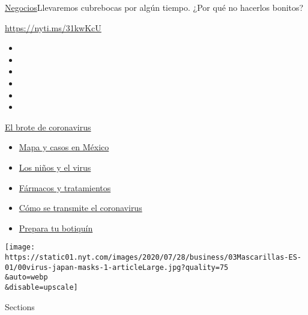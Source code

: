 \href{/es/section/negocios}{Negocios}\textbar{}Llevaremos cubrebocas por
algún tiempo. ¿Por qué no hacerlos bonitos?

\url{https://nyti.ms/31kwKcU}

\begin{itemize}
\item
\item
\item
\item
\item
\item
\end{itemize}

\href{https://www.nytimes.com/es/spotlight/coronavirus?action=click\&pgtype=Article\&state=default\&region=TOP_BANNER\&context=storylines_menu}{El
brote de coronavirus}

\begin{itemize}
\tightlist
\item
  \href{https://www.nytimes.com/es/interactive/2020/espanol/america-latina/coronavirus-en-mexico.html?action=click\&pgtype=Article\&state=default\&region=TOP_BANNER\&context=storylines_menu}{Mapa
  y casos en México}
\item
  \href{https://www.nytimes.com/es/2020/07/31/espanol/ciencia-y-tecnologia/ninos-contagio-coronavirus.html?action=click\&pgtype=Article\&state=default\&region=TOP_BANNER\&context=storylines_menu}{Los
  niños y el virus}
\item
  \href{https://www.nytimes.com/es/interactive/2020/science/coronavirus-tratamientos-curas.html?action=click\&pgtype=Article\&state=default\&region=TOP_BANNER\&context=storylines_menu}{Fármacos
  y tratamientos}
\item
  \href{https://www.nytimes.com/es/2020/07/06/espanol/ciencia-y-tecnologia/coronavirus-transmision-aire.html?action=click\&pgtype=Article\&state=default\&region=TOP_BANNER\&context=storylines_menu}{Cómo
  se transmite el coronavirus}
\item
  \href{https://www.nytimes.com/es/2020/07/14/espanol/estilos-de-vida/botiquin-medicina-coronavirus.html?action=click\&pgtype=Article\&state=default\&region=TOP_BANNER\&context=storylines_menu}{Prepara
  tu botiquín}
\end{itemize}

\texttt{[image: https://static01.nyt.com/images/2020/07/28/business/03Mascarillas-ES-01/00virus-japan-masks-1-articleLarge.jpg?quality=75\\\&auto=webp\\\&disable=upscale]}

Sections

